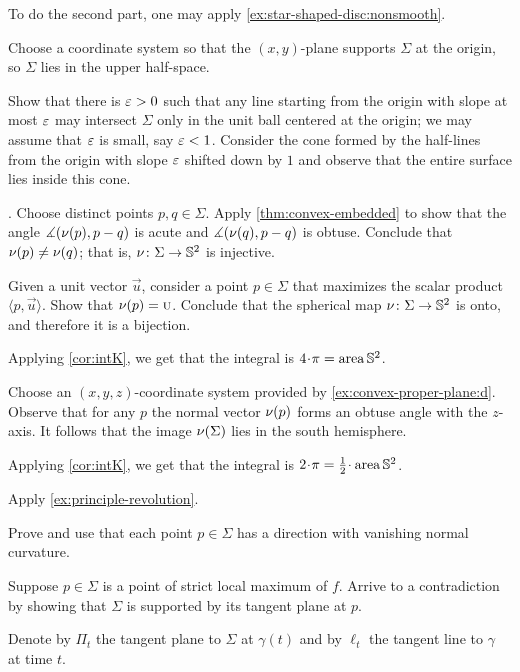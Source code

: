 To do the second part, one may apply \ref{ex:star-shaped-disc:nonsmooth}.


Choose a coordinate system so that the $(x,y)$-plane supports $\Sigma$ at the origin, so $\Sigma$ lies in the upper half-space.

Show that there is $\varepsilon>0$ such that any line starting from the origin with slope at most $\varepsilon$ may intersect $\Sigma$ only in the unit ball centered at the origin;
we may assume that $\varepsilon$ is small, say $\varepsilon<1$.
Consider the cone formed by the half-lines from the origin with slope $\varepsilon$ shifted down by $1$ and observe that the entire surface lies inside this cone.



\parbf{\ref{ex:intK}}.
Choose distinct points $p,q\in\Sigma$.
Apply \ref{thm:convex-embedded} to show that the angle 
$\measuredangle(\nu(p),p-q)$ is acute and $\measuredangle(\nu(q),p-q)$ is obtuse.
Conclude that $\nu(p)\ne\nu(q)$;
that is, $\nu\colon\Sigma\to\mathbb{S}^2$ is injective.


Given a unit vector $\vec u$, consider a point $p\in \Sigma$ that maximizes the scalar product $\langle p,\vec u\rangle$.
Show that $\nu(p)=\text{\sc{u}}$.
Conclude that the spherical map $\nu\colon\Sigma\to\mathbb{S}^2$ is onto, and therefore it is a bijection.

Applying \ref{cor:intK}, we get that the integral is $4\cdot\pi=\area\mathbb{S}^2$.

 Choose an $(x,y,z)$-coordinate system provided by \ref{ex:convex-proper-plane:d}.
Observe that for any $p$ the normal vector $\nu(p)$ forms an obtuse angle with the $z$-axis.
It follows that the image $\nu(\Sigma)$ lies in the south hemisphere.

Applying \ref{cor:intK}, we get that the integral is $2\cdot\pi=\tfrac12\cdot\area\mathbb{S}^2$.

Apply \ref{ex:principle-revolution}.

 Prove and use that each point $p\in\Sigma$ has a direction with vanishing normal curvature.

 Suppose $p\in \Sigma$ is a point of strict  local maximum of $f$.
Arrive to a contradiction by showing that $\Sigma$ is supported by its tangent plane at $p$.


 Denote by $\Pi_t$ the tangent plane to $\Sigma$ at $\gamma(t)$ and by $\ell_t$ the tangent line to $\gamma$ at time $t$.

